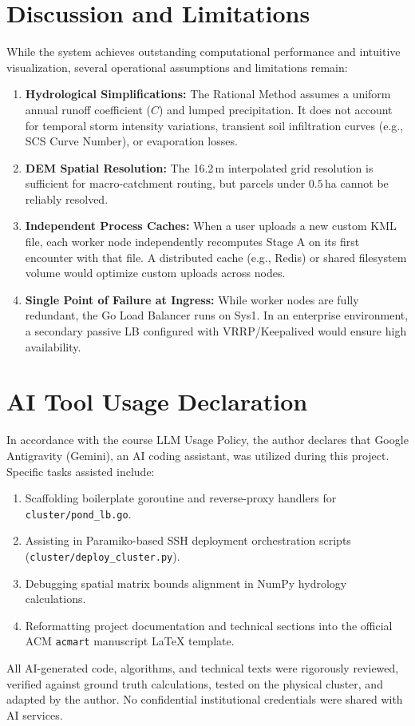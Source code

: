 \documentclass[manuscript,screen,review]{acmart}
\begin{document}
\section{Discussion and Limitations}
\label{sec:discussion}
While the system achieves outstanding computational performance and intuitive visualization, several operational assumptions and limitations remain:
\begin{enumerate}
    \item \textbf{Hydrological Simplifications:} The Rational Method assumes a uniform annual runoff coefficient ($C$) and lumped precipitation. It does not account for temporal storm intensity variations, transient soil infiltration curves (e.g., SCS Curve Number), or evaporation losses.
    \item \textbf{DEM Spatial Resolution:} The 16.2\,m interpolated grid resolution is sufficient for macro-catchment routing, but parcels under $0.5$\,ha cannot be reliably resolved.
    \item \textbf{Independent Process Caches:} When a user uploads a new custom KML file, each worker node independently recomputes Stage A on its first encounter with that file. A distributed cache (e.g., Redis) or shared filesystem volume would optimize custom uploads across nodes.
    \item \textbf{Single Point of Failure at Ingress:} While worker nodes are fully redundant, the Go Load Balancer runs on Sys1. In an enterprise environment, a secondary passive LB configured with VRRP/Keepalived would ensure high availability.
\end{enumerate}

\section{AI Tool Usage Declaration}
\label{sec:ai-usage}
In accordance with the course LLM Usage Policy, the author declares that Google Antigravity (Gemini), an AI coding assistant, was utilized during this project. Specific tasks assisted include:
\begin{enumerate}
    \item Scaffolding boilerplate goroutine and reverse-proxy handlers for \texttt{cluster/pond\_lb.go}.
    \item Assisting in Paramiko-based SSH deployment orchestration scripts (\texttt{cluster/deploy\_cluster.py}).
    \item Debugging spatial matrix bounds alignment in NumPy hydrology calculations.
    \item Reformatting project documentation and technical sections into the official ACM \texttt{acmart} manuscript LaTeX template.
\end{enumerate}
All AI-generated code, algorithms, and technical texts were rigorously reviewed, verified against ground truth calculations, tested on the physical cluster, and adapted by the author. No confidential institutional credentials were shared with AI services.
\end{document}
